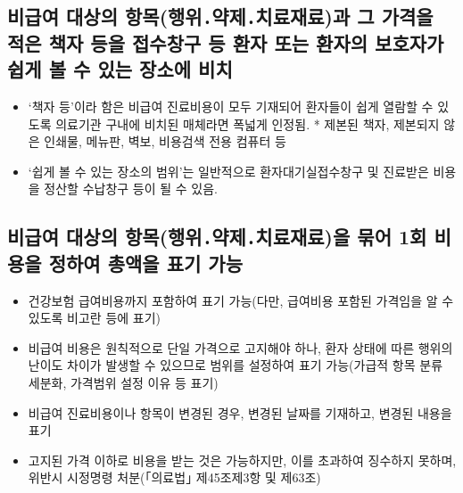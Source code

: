 \subsection{비급여 대상의 항목(행위․약제․치료재료)과 그 가격을 적은 책자 등을 접수창구 등 환자 또는 환자의 보호자가 쉽게 볼 수 있는 장소에 비치}
\begin{itemize}\tightlist
\item `책자 등'이라 함은 비급여 진료비용이 모두 기재되어 환자들이 쉽게 열람할 수 있도록 의료기관 구내에 비치된 매체라면 폭넓게 인정됨. 
     * 제본된 책자, 제본되지 않은 인쇄물, 메뉴판, 벽보, 비용검색 전용 컴퓨터 등
\item `쉽게 볼 수 있는 장소의 범위'는 일반적으로 환자대기실\cntrdot{}접수창구 및 진료받은 비용을 정산할 수납창구 등이 될 수 있음.
\end{itemize}

\subsection{비급여 대상의 항목(행위․약제․치료재료)을 묶어 1회 비용을 정하여 총액을 표기 가능}
\begin{itemize}\tightlist
\item 건강보험 급여비용까지 포함하여 표기 가능(다만, 급여비용 포함된 가격임을 알 수 있도록 비고란 등에 표기)
\item 비급여 비용은 원칙적으로 단일 가격으로 고지해야 하나, 환자 상태에 따른 행위의 난이도 차이가 발생할 수 있으므로 범위를 설정하여 표기 가능(가급적 항목 분류 세분화, 가격범위 설정 이유 등 표기)
\item 비급여 진료비용이나 항목이 변경된 경우, 변경된 날짜를 기재하고, 변경된 내용을 표기
\item 고지된 가격 이하로 비용을 받는 것은 가능하지만, 이를 초과하여 징수하지 못하며, 위반시 시정명령 처분(｢의료법｣ 제45조제3항 및 제63조)
\end{itemize}
\prezi{\clearpage}


